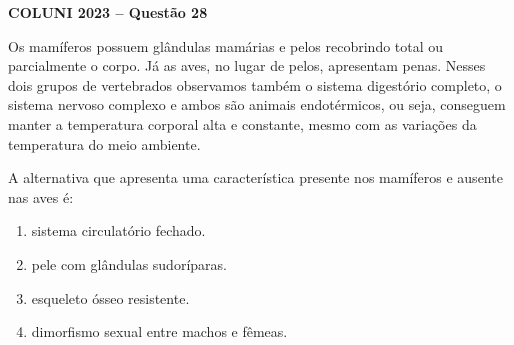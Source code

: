 \textbf{COLUNI 2023 -- Questão 28}\par\medskip Os mamíferos possuem glândulas mamárias e pelos recobrindo total ou parcialmente o corpo. Já as aves, no lugar de pelos, apresentam penas. Nesses dois grupos de vertebrados observamos também o sistema digestório completo, o sistema nervoso complexo e ambos são animais endotérmicos, ou seja, conseguem manter a temperatura corporal alta e constante, mesmo com as variações da temperatura do meio ambiente.

\par

A alternativa que apresenta uma característica presente nos mamíferos e ausente nas aves é:\begin{enumerate}
\item sistema circulatório fechado.
\item pele com glândulas sudoríparas.
\item esqueleto ósseo resistente.
\item dimorfismo sexual entre machos e fêmeas.\end{enumerate}
